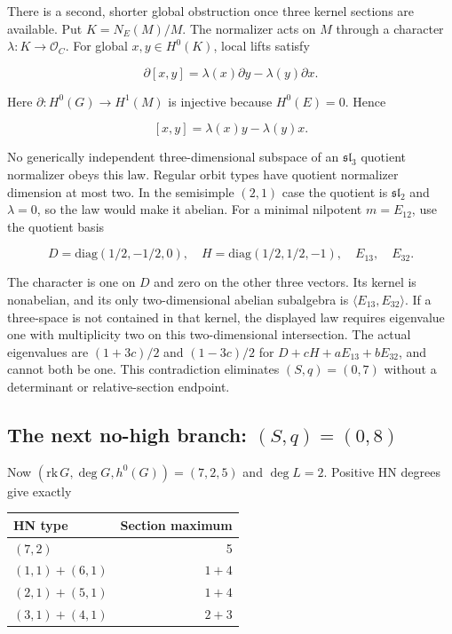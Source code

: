 \documentclass[11pt]{article}
\theoremstyle{definition}
\begin{document}
There is a second, shorter global obstruction once three kernel sections
are available. Put \(K=N_E(M)/M\). The normalizer acts on \(M\) through
a character \(\lambda:K\to\mathcal O_C\). For global \(x,y\in H^0(K)\),
local lifts satisfy

\[\partial[x,y]=\lambda(x)\partial y-\lambda(y)\partial x.\]

Here \(\partial:H^0(G)\to H^1(M)\) is injective because \(H^0(E)=0\).
Hence

\[[x,y]=\lambda(x)y-\lambda(y)x.\]

No generically independent three-dimensional subspace of an
\(\mathfrak{sl}_3\) quotient normalizer obeys this law. Regular orbit
types have quotient normalizer dimension at most two. In the semisimple
\((2,1)\) case the quotient is \(\mathfrak{sl}_2\) and \(\lambda=0\), so
the law would make it abelian. For a minimal nilpotent \(m=E_{12}\), use
the quotient basis

\[D=\mathrm{diag}(1/2,-1/2,0),\quad
H=\mathrm{diag}(1/2,1/2,-1),\quad E_{13},\quad E_{32}.\]

The character is one on \(D\) and zero on the other three vectors. Its
kernel is nonabelian, and its only two-dimensional abelian subalgebra is
\(\langle E_{13},E_{32}\rangle\). If a three-space is not contained in
that kernel, the displayed law requires eigenvalue one with multiplicity
two on this two-dimensional intersection. The actual eigenvalues are
\((1+3c)/2\) and \((1-3c)/2\) for \(D+cH+aE_{13}+bE_{32}\), and cannot
both be one. This contradiction eliminates \((S,q)=(0,7)\) without a
determinant or relative-section endpoint.

\subsection{\texorpdfstring{The next no-high branch:
\((S,q)=(0,8)\)}{The next no-high branch: (S,q)=(0,8)}}\label{the-next-no-high-branch-sq08}

Now \((\mathrm{rk}\,G,\deg G,h^0(G))=(7,2,5)\) and \(\deg L=2\).
Positive HN degrees give exactly

\begin{longtable}[]{@{}lr@{}}
\toprule\noalign{}
HN type & Section maximum \\
\midrule\noalign{}
\endhead
\bottomrule\noalign{}
\endlastfoot
\((7,2)\) & 5 \\
\((1,1)+(6,1)\) & \(1+4\) \\
\((2,1)+(5,1)\) & \(1+4\) \\
\((3,1)+(4,1)\) & \(2+3\) \\
\end{longtable}
\end{document}
